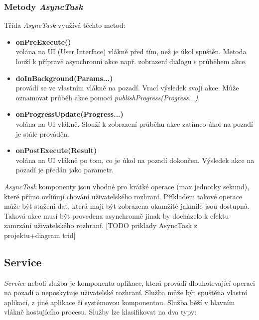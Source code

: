\documentclass{diplomka}
\begin{document}
\subsubsection*{Metody \emph{AsyncTask}}
Třída \emph{AsyncTask} využívá těchto metod:
\begin{itemize}[]
\item \textbf{onPreExecute()}\\
volána na UI (User Interface) vlákně před tím, než je úkol spuštěn. Metoda louží k přípravě asynchronní akce např. zobrazení dialogu s průběhem akce.
\item \textbf{doInBackground(Params...)}\\
provádí se ve vlastním vlákně na pozadí. Vrací výsledek svojí akce. Může oznamovat průběh akce pomocí \emph{ publishProgress(Progress...)}.
\item \textbf{onProgressUpdate(Progress...)}\\
volána na UI vlákně. Slouží k zobrazení průběhu akce zatímco úkol na pozadí je stále prováděn.
\item \textbf{onPostExecute(Result)}\\
volána na UI vlákně po tom, co je úkol na pozadí dokončen. Výsledek akce na pozadí je předán jako parametr.
\end{itemize}

\emph{AsyncTask} komponenty jsou vhodné pro krátké operace (max jednotky sekund), které přímo ovliňují chování uživatelského rozhraní. Příkladem takové operace může být stažení dat, která mají být zobrazena okamžitě jakmile jsou dostupná. Taková akce musí být provedena asynchronně jinak by docházelo k efektu zamrzání uživatelského rozhraní.
[TODO priklady AsyncTask z projektu+diagram trid]

\subsection{Service}
\emph{Service} neboli služba je komponenta aplikace, která provádí dlouhotrvající operaci na pozadí a neposkytuje uživatelské rozhraní. Služba může být spuštěna vlastní aplikací, z jiné aplikace či systémovou komponentou.  Služba běží v hlavním vlákně hostujícího procesu. Služby lze klasifikovat na dva typy:
\end{document}
